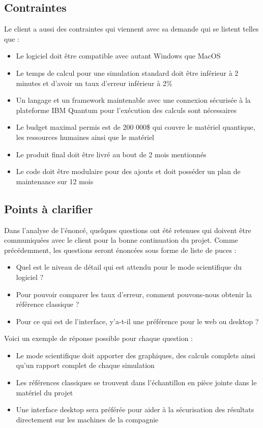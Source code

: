 \documentclass[11pt]{article}
\begin{document}
\subsection{Contraintes}
Le client a aussi des contraintes qui viennent avec sa demande qui se listent telles que :

\begin{itemize}
  \item Le logiciel doit être compatible avec autant Windows que MacOS
  \item Le temps de calcul pour une simulation standard doit être inférieur à 2 minutes et d'avoir un taux d'erreur inférieur à 2\%
  \item Un langage et un framework maintenable avec une connexion sécurisée à la plateforme IBM Quantum pour l’exécution des calculs sont nécessaires
  \item Le budget maximal permis est de 200 000\$ qui couvre le matériel quantique, les ressources humaines ainsi que le matériel
  \item Le produit final doit être livré au bout de 2 mois mentionnés
  \item Le code doit être modulaire pour des ajouts et doit posséder un plan de maintenance sur 12 mois
\end{itemize}

\subsection{Points à clarifier}
Dans l'analyse de l'énoncé, quelques questions ont été retenues qui doivent être communiquées avec le client pour la bonne continuation du projet. Comme précédemment, les questions seront énoncées sous forme de liste de puces :

\begin{itemize}
  \item Quel est le niveau de détail qui est attendu pour le mode scientifique du logiciel ?
  \item Pour pouvoir comparer les taux d'erreur, comment pouvons-nous obtenir la référence classique ?
  \item Pour ce qui est de l'interface, y'a-t-il une préférence pour le web ou desktop ?
\end{itemize}
Voici un exemple de réponse possible pour chaque question :

\begin{itemize}
  \item Le mode scientifique doit apporter des graphiques, des calculs complets ainsi qu'un rapport complet de chaque simulation
  \item Les références classiques se trouvent dans l'échantillon en pièce jointe dans le matériel du projet
  \item Une interface desktop sera préférée pour aider à la sécurisation des résultats directement sur les machines de la compagnie
\end{itemize}
\end{document}
